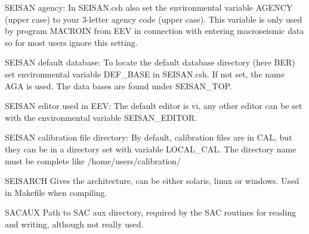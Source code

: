 
SEISAN agency:\newline
In SEISAN.csh also set the environmental variable AGENCY (upper case) to your 3-letter agency code (upper case). This variable is only used by program MACROIN from EEV in connection with entering macroseismic data so for most users ignore this setting. 

SEISAN default database:\newline
To locate the default database directory (here BER) set environmental variable DEF\_BASE in SEISAN.csh. If not set, the name AGA is used. The data bases are found under SEISAN\_TOP. 

SEISAN editor used in EEV:\newline
The default editor is vi, any other editor can be set with the environmental variable SEISAN\_EDITOR. 

SEISAN calibration file directory:\newline
By default, calibration files are in CAL, but they can be in a directory set with variable LOCAL\_CAL. The directory name must be complete like /home/users/calibration/ 

SEISARCH\newline
Gives the architecture, can be either solaris, linux or windows. Used in Makefile when compiling. 

SACAUX\newline
Path to SAC aux directory, required by the SAC routines  for reading and writing, although not really used. 

